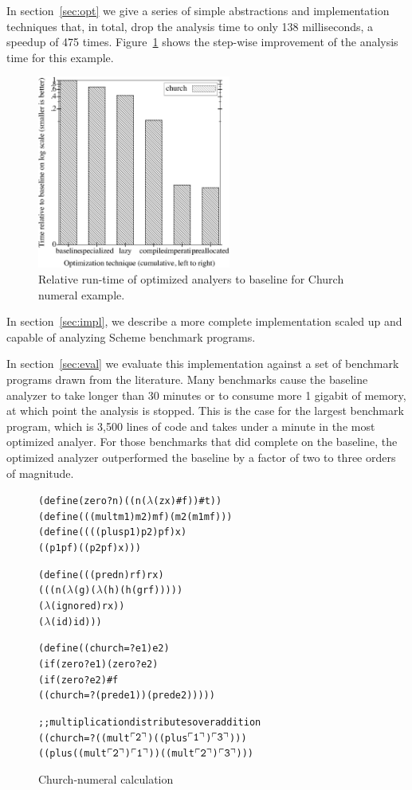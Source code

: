 \documentclass[preprint,onecolumn,9pt]{sigplanconf} %
\begin{document}
In section~\ref{sec:opt} we give a series of simple abstractions and
implementation techniques that, in total, drop the analysis time to
only 138 milliseconds, a speedup of 475 times.
Figure~\ref{fig:churchtime} shows the step-wise improvement of the
analysis time for this example.

\begin{figure}
\begin{center}
\includegraphics[width=2.5in]{rel-time-church.ps}
\end{center}
\caption{Relative run-time of
optimized analyers to baseline for Church numeral example.}
\label{fig:churchtime}
\end{figure}

In section~\ref{sec:impl}, we describe a more complete implementation
scaled up and capable of analyzing Scheme benchmark programs.

In section~\ref{sec:eval} we evaluate this implementation against a
set of benchmark programs drawn from the literature.  Many benchmarks
cause the baseline analyzer to take longer than 30 minutes or to
consume more 1 gigabit of memory, at which point the analysis is
stopped.  This is the case for the largest benchmark program, which is
3,500 lines of code and takes under a minute in the most optimized
analyer.  For those benchmarks that did complete on the baseline, the
optimized analyzer outperformed the baseline by a factor of
two to
three orders of magnitude.


\newcommand{\church}[1]{\(\ulcorner{\tt #1}\urcorner\)}

\begin{figure}
\begin{alltt}
(define (zero? n) ((n (\(\lambda\) (zx) #f)) #t))
(define (((mult m1) m2) mf) (m2 (m1 mf)))
(define ((((plus p1) p2) pf) x)
  ((p1 pf) ((p2 pf) x)))

(define (((pred n) rf) rx)
  (((n (\(\lambda\) (g) (\(\lambda\) (h) (h (g rf)))))
    (\(\lambda\) (ignored) rx))
   (\(\lambda\) (id) id)))

(define ((church=? e1) e2)
  (if (zero? e1) (zero? e2)
      (if (zero? e2) #f
          ((church=? (pred e1)) (pred e2)))))

;; multiplication distributes over addition
((church=? ((mult \church2) ((plus \church1) \church3)))
 ((plus ((mult \church2) \church1)) ((mult \church2) \church3)))
\end{alltt}
\caption{Church-numeral calculation}
\label{fig:church}
\end{figure}
\end{document}
